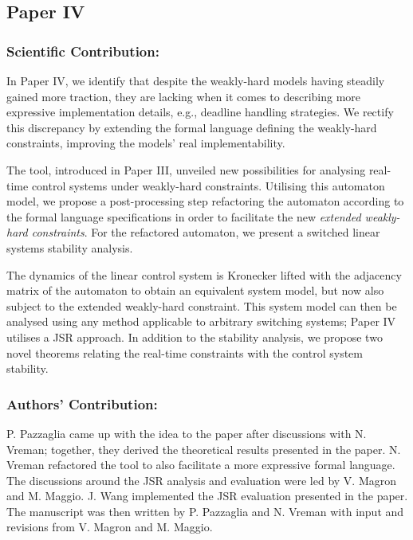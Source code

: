 \clearpage %

\subsection*{Paper IV}%
%
\begin{quote}
\end{quote}

\subsubsection*{Scientific Contribution:}%
%
In Paper IV, we identify that despite the weakly-hard models having steadily gained more traction, they are lacking when it comes to describing more expressive implementation details, e.g., deadline handling strategies.
We rectify this discrepancy by extending the formal language defining the weakly-hard constraints, improving the models' real implementability.

The \tool{} tool, introduced in Paper III, unveiled new possibilities for analysing real-time control systems under weakly-hard constraints.
Utilising this automaton model, we propose a post-processing step refactoring the automaton according to the formal language specifications in order to facilitate the new \emph{extended weakly-hard constraints}.
For the refactored automaton, we present a switched linear systems stability analysis.

The dynamics of the linear control system is Kronecker lifted with the adjacency matrix of the automaton to obtain an equivalent system model, but now also subject to the extended weakly-hard constraint.
This system model can then be analysed using any method applicable to arbitrary switching systems; Paper IV utilises a JSR approach.
In addition to the stability analysis, we propose two novel theorems relating the real-time constraints with the control system stability.

\subsubsection*{Authors' Contribution:}%
%
P. Pazzaglia came up with the idea to the paper after discussions with N. Vreman; together, they derived the theoretical results presented in the paper.
N. Vreman refactored the \tool{} tool to also facilitate a more expressive formal language.
The discussions around the JSR analysis and evaluation were led by V. Magron and M. Maggio.
J. Wang implemented the JSR evaluation presented in the paper.
The manuscript was then written by P. Pazzaglia and N. Vreman with input and revisions from V. Magron and M. Maggio.




